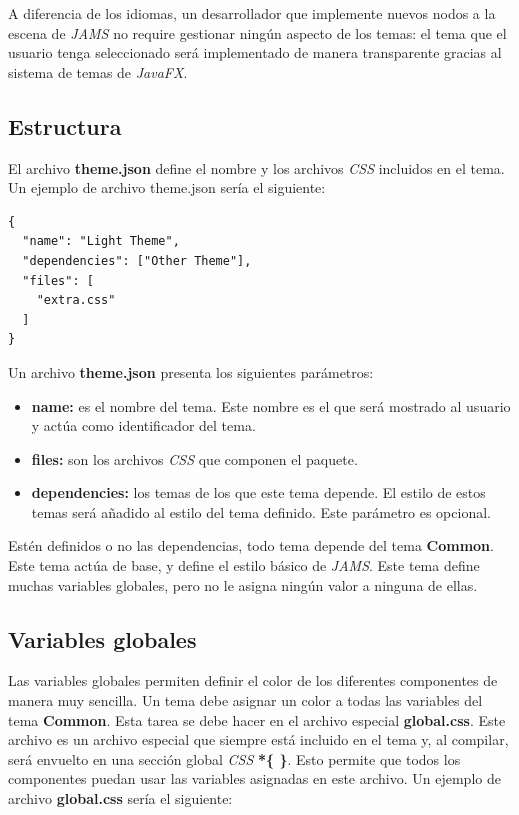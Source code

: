 \noindent A diferencia de los idiomas, un desarrollador que implemente nuevos
nodos a la escena de \textit{JAMS} no require gestionar ningún aspecto
de los temas: el tema que el usuario tenga seleccionado será implementado
de manera transparente gracias al sistema de temas de \textit{JavaFX}.

\subsection{Estructura}\label{subsec:estructura}

El archivo \textbf{theme.json} define el nombre y los archivos
\textit{CSS} incluidos en el tema.
Un ejemplo de archivo theme.json sería el siguiente:
\begin{lstlisting}[frame=single,label={lst:theme.json}]
{
  "name": "Light Theme",
  "dependencies": ["Other Theme"],
  "files": [
    "extra.css"
  ]
}
\end{lstlisting}

\noindent Un archivo \textbf{theme.json} presenta los siguientes parámetros:
\begin{itemize}
    \item \textbf{name:} es el nombre del tema.
    Este nombre es el que será mostrado al usuario
    y actúa como identificador del tema.
    \item \textbf{files:} son los archivos \textit{CSS} que componen el paquete.
    \item \textbf{dependencies:} los temas de los que este tema depende.
    El estilo de estos temas será añadido al estilo del tema definido.
    Este parámetro es opcional.
\end{itemize}

\noindent Estén definidos o no las dependencias,
todo tema depende del tema \textbf{Common}.
Este tema actúa de base, y define el estilo básico de \textit{JAMS}.
Este tema define muchas variables globales, pero no le asigna ningún
valor a ninguna de ellas.

\subsection{Variables globales}\label{subsec:variables-globales}

Las variables globales permiten definir el color de los diferentes
componentes de manera muy sencilla.
Un tema debe asignar un color a todas las variables del tema \textbf{Common}.
Esta tarea se debe hacer en el archivo especial \textbf{global.css}.
Este archivo es un archivo especial que siempre está incluido en el tema y,
al compilar, será envuelto en una sección global \textit{CSS} \textbf{*\{ \}}.
Esto permite que todos los componentes puedan usar
las variables asignadas en este archivo.
Un ejemplo de archivo \textbf{global.css} sería el siguiente:

